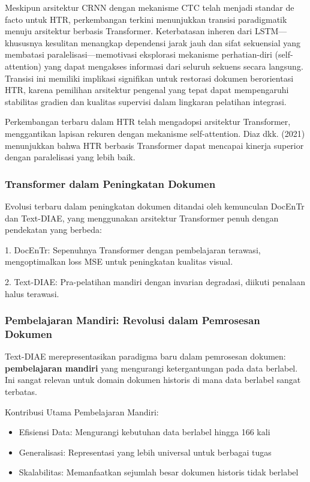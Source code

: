 \documentclass[12pt,a4paper]{book}
\begin{document}
\vspace{1.5ex}

Meskipun arsitektur CRNN dengan mekanisme CTC telah menjadi standar de facto untuk HTR, perkembangan terkini menunjukkan transisi paradigmatik menuju arsitektur berbasis Transformer. Keterbatasan inheren dari LSTM—khususnya kesulitan menangkap dependensi jarak jauh dan sifat sekuensial yang membatasi paralelisasi—memotivasi eksplorasi mekanisme perhatian-diri (self-attention) yang dapat mengakses informasi dari seluruh sekuens secara langsung. Transisi ini memiliki implikasi signifikan untuk restorasi dokumen berorientasi HTR, karena pemilihan arsitektur pengenal yang tepat dapat mempengaruhi stabilitas gradien dan kualitas supervisi dalam lingkaran pelatihan integrasi.

Perkembangan terbaru dalam HTR telah mengadopsi arsitektur Transformer, menggantikan lapisan rekuren dengan mekanisme self-attention. Diaz dkk. (2021) menunjukkan bahwa HTR berbasis Transformer dapat mencapai kinerja superior dengan paralelisasi yang lebih baik.

\subsubsection{Transformer dalam Peningkatan Dokumen}
\label{subsubsec:transformer-dokumen}

Evolusi terbaru dalam peningkatan dokumen ditandai oleh kemunculan DocEnTr dan Text-DIAE, yang menggunakan arsitektur Transformer penuh dengan pendekatan yang berbeda:

1. DocEnTr: Sepenuhnya Transformer dengan pembelajaran terawasi, mengoptimalkan loss MSE untuk peningkatan kualitas visual.

2. Text-DIAE: Pra-pelatihan mandiri dengan invarian degradasi, diikuti penalaan halus terawasi.

\subsubsection{Pembelajaran Mandiri: Revolusi dalam Pemrosesan Dokumen}
\label{subsubsec:pembelajaran-mandiri}

Text-DIAE merepresentasikan paradigma baru dalam pemrosesan dokumen: \textbf{pembelajaran mandiri} yang mengurangi ketergantungan pada data berlabel. Ini sangat relevan untuk domain dokumen historis di mana data berlabel sangat terbatas.

Kontribusi Utama Pembelajaran Mandiri:
\begin{itemize}
 \item Efisiensi Data: Mengurangi kebutuhan data berlabel hingga 166 kali
 \item Generalisasi: Representasi yang lebih universal untuk berbagai tugas
 \item Skalabilitas: Memanfaatkan sejumlah besar dokumen historis tidak berlabel
\end{itemize}
\end{document}
